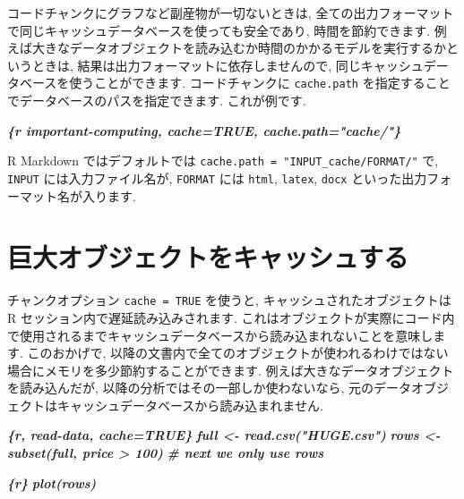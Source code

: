 \documentclass[
  11pt,
  lualatex,ja=standard,jafont=noto]{bxjsreport}
\newenvironment{Shaded}{\begin{snugshade}}{\end{snugshade}}
\newcommand{\InformationTok}[1]{\textcolor[rgb]{0.56,0.35,0.01}{\textbf{\textit{#1}}}}
\begin{document}
コードチャンクにグラフなど副産物が一切ないときは, 全ての出力フォーマットで同じキャッシュデータベースを使っても安全であり, 時間を節約できます. 例えば大きなデータオブジェクトを読み込むか時間のかかるモデルを実行するかというときは, 結果は出力フォーマットに依存しませんので, 同じキャッシュデータベースを使うことができます. コードチャンクに \texttt{cache.path} を指定することでデータベースのパスを指定できます. これが例です.

\begin{Shaded}
\begin{Highlighting}[]
\InformationTok{\textasciigrave{}\textasciigrave{}\textasciigrave{}\{r important{-}computing, cache=TRUE, cache.path="cache/"\}}
\InformationTok{\textasciigrave{}\textasciigrave{}\textasciigrave{}}
\end{Highlighting}
\end{Shaded}

R Markdown ではデフォルトでは \texttt{cache.path = "INPUT\_cache/FORMAT/"} で, \texttt{INPUT} には入力ファイル名が, \texttt{FORMAT} には \texttt{html}, \texttt{latex}, \texttt{docx} といった出力フォーマット名が入ります.

\hypertarget{cache-lazy}{%
\section{巨大オブジェクトをキャッシュする}\label{cache-lazy}}

チャンクオプション \texttt{cache = TRUE} を使うと, キャッシュされたオブジェクトは R セッション内で遅延読み込みされます. これはオブジェクトが実際にコード内で使用されるまでキャッシュデータベースから読み込まれないことを意味します. このおかげで, 以降の文書内で全てのオブジェクトが使われるわけではない場合にメモリを多少節約することができます. 例えば大きなデータオブジェクトを読み込んだが, 以降の分析ではその一部しか使わないなら, 元のデータオブジェクトはキャッシュデータベースから読み込まれません.

\begin{Shaded}
\begin{Highlighting}[]
\InformationTok{\textasciigrave{}\textasciigrave{}\textasciigrave{}\{r, read{-}data, cache=TRUE\}}
\InformationTok{full \textless{}{-} read.csv("HUGE.csv")}
\InformationTok{rows \textless{}{-} subset(full, price \textgreater{} 100)}
\InformationTok{\# next we only use \textasciigrave{}rows\textasciigrave{}}
\InformationTok{\textasciigrave{}\textasciigrave{}\textasciigrave{}}

\InformationTok{\textasciigrave{}\textasciigrave{}\textasciigrave{}\{r\}}
\InformationTok{plot(rows)}
\InformationTok{\textasciigrave{}\textasciigrave{}\textasciigrave{}}
\end{Highlighting}
\end{Shaded}
\end{document}
